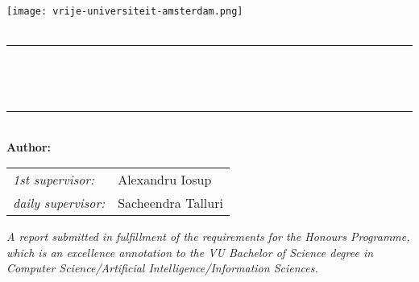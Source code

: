 \begin{titlepage}
    \newcommand{\HRule}{\rule{0.8\linewidth}{0.2mm}}

    \centering

    \vspace*{6em}

    \textsc{\large \theinstitution}\\[1em]

    \texttt{[image: vrije-universiteit-amsterdam.png]}\\
    \vspace{4em}
    \textsc{\Large \thesubject}\\
    \vspace{4em}

    \HRule\\[0.7cm]

    \begin{minipage}{0.75\textwidth}
      \centering
      {\LARGE\bfseries \thetitle}\\[0.4cm]
      \vspace{1em}
    \end{minipage}

    \HRule\\[1.5cm]

    {\Large \textbf{Author:} \theauthor}\\
    \vspace{2em}
    \begin{minipage}{0.7\textwidth}
      \large
      \centering
      \begin{tabular}{ l l }
        \textit{1st supervisor:}      & Alexandru Iosup\\
        \textit{daily supervisor:}    & Sacheendra Talluri\\
      \end{tabular}
    \end{minipage}

    \vfill
    \begin{minipage}{0.8\textwidth}
      \centering
      \textit{\large
        A report submitted in fulfillment of the requirements for the Honours Programme, which is an excellence annotation to the VU Bachelor of Science
        degree in Computer Science/Artificial Intelligence/Information Sciences.
      }
    \end{minipage}

    \vspace{2em}
    {\large\thedate}

    \vspace{4em}
\end{titlepage}
